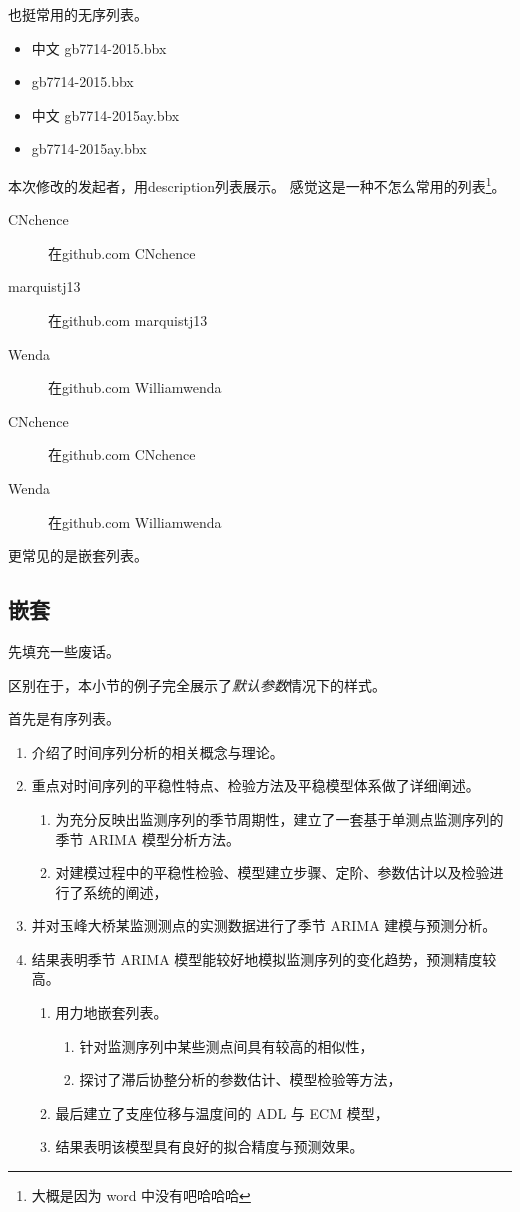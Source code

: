 \documentclass[UTF8,AutoFakeBold,zihao=-4,scheme=chinese]{ctexart}
\begin{document}
也挺常用的无序列表。

\begin{itemize}
  \item 中文 gb7714-2015.bbx
  \item gb7714-2015.bbx
  \item 中文 gb7714-2015ay.bbx
  \item gb7714-2015ay.bbx
\end{itemize}

本次修改的发起者，用description列表展示。
感觉这是一种不怎么常用的列表\footnote{大概是因为 word 中没有吧哈哈哈}。

\begin{description}
  \item[CNchence] 在github.com CNchence
  \item[marquistj13] 在github.com marquistj13
  \item[Wenda] 在github.com Williamwenda
  \item[CNchence] 在github.com CNchence
  \item[Wenda] 在github.com Williamwenda
\end{description}

更常见的是嵌套列表。

\subsection{嵌套}

先填充一些废话。\zhlipsum[6]

区别在于，本小节的例子完全展示了\emph{默认参数}情况下的样式。

首先是有序列表。
\begin{enumerate}
  \item 介绍了时间序列分析的相关概念与理论。
  \item 重点对时间序列的平稳性特点、检验方法及平稳模型体系做了详细阐述。
  \begin{enumerate}
    \item 为充分反映出监测序列的季节周期性，建立了一套基于单测点监测序列的季节 ARIMA 模型分析方法。
    \item 对建模过程中的平稳性检验、模型建立步骤、定阶、参数估计以及检验进行了系统的阐述，
  \end{enumerate}
  \item 并对玉峰大桥某监测测点的实测数据进行了季节 ARIMA 建模与预测分析。
  \item 结果表明季节 ARIMA 模型能较好地模拟监测序列的变化趋势，预测精度较高。
  \begin{enumerate}
    \item 用力地嵌套列表。
    \begin{enumerate}
      \item 针对监测序列中某些测点间具有较高的相似性，
      \item 探讨了滞后协整分析的参数估计、模型检验等方法，
    \end{enumerate}
    \item 最后建立了支座位移与温度间的 ADL 与 ECM 模型，
    \item 结果表明该模型具有良好的拟合精度与预测效果。
  \end{enumerate}
\end{enumerate}
\end{document}

